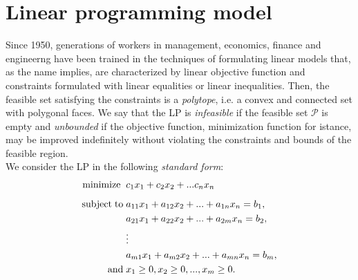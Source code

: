 \documentclass[a4paper,10 pt,titlepage,twoside]{book}
\theoremstyle{plain}
\theoremstyle{definition}
\theoremstyle{remark}
\begin{document}
\section{Linear programming model}

Since 1950, generations of workers in management, economics, finance and engineerng have been trained in the techniques of formulating linear models that,
as the name implies, are characterized by linear objective function and constraints formulated with linear equalities or linear inequalities.
Then, the feasible set satisfying the constraints is a \textit{polytope}, i.e. a convex and connected set with polygonal faces. We say that the LP is \textit{infeasible} if the feasible set $\mathcal{P}$ is empty and \textit{unbounded} if the objective function, minimization function for istance, may be improved indefinitely without violating the constraints and bounds of the feasible region.\\
We consider the LP in the following \textit{standard form}:
\begin{alignat*}{1}\label{eq:stdform}
\text{minimize\;}\; &c_1 x_1 + c_2 x_2+ ... c_n x_n\\[1.8mm]
\text{subject\;to\;} &a_{11} x_1 + a_{12} x_2+ ... +a_{1n}x_n = b_1,\\
&a_{21} x_1 + a_{22} x_2 + ... + a_{2m} x_n= b_2,\\
&\vdots\\
&a_{m1} x_1 + a_{m2} x_2 + ... + a_{mn} x_n= b_m,\\
\text{and}\; & x_1 \geq 0 , x_2 \geq 0, ... , x_m \geq 0.
 \end{alignat*}
\end{document}
